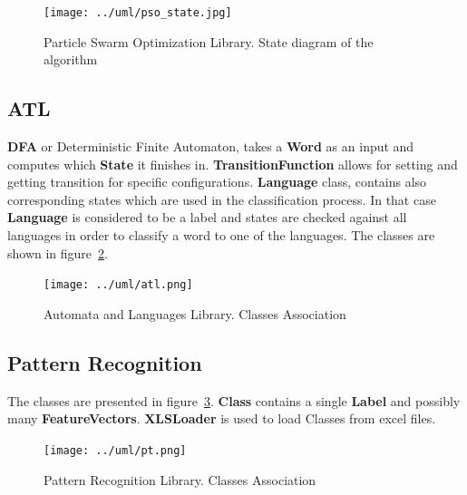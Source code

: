 \documentclass{mini}
\begin{document}
\begin{figure}
    \centering
    \texttt{[image: ../uml/pso\_state.jpg]}
    \caption{Particle Swarm Optimization Library. State diagram of the algorithm }
    \label{fig:lib_pso_states}
\end{figure}


\subsection{ATL}

{\bf DFA} or Deterministic Finite Automaton, takes a {\bf Word} as an input and computes which {\bf State} it finishes in. {\bf TransitionFunction} allows for setting and getting transition for specific configurations. {\bf Language} class, contains also corresponding states which are used in the classification process. In that case {\bf Language} is considered to be a label and states are checked against all languages in order to classify a word to one of the languages. The classes are shown in figure~\ref{fig:lib_atl}.


\begin{figure}
    \centering
    \texttt{[image: ../uml/atl.png]}
    \caption{Automata and Languages Library. Classes Association}
    \label{fig:lib_atl}
\end{figure}


\subsection{Pattern Recognition}

The classes are presented in figure~\ref{fig:lib_pt}. {\bf Class} contains a single {\bf Label} and possibly many {\bf FeatureVectors}. {\bf XLSLoader} is used to load Classes from excel files.

\begin{figure}
    \centering
    \texttt{[image: ../uml/pt.png]}
    \caption{Pattern Recognition Library. Classes Association}
    \label{fig:lib_pt}
\end{figure}
 
\end{document}

